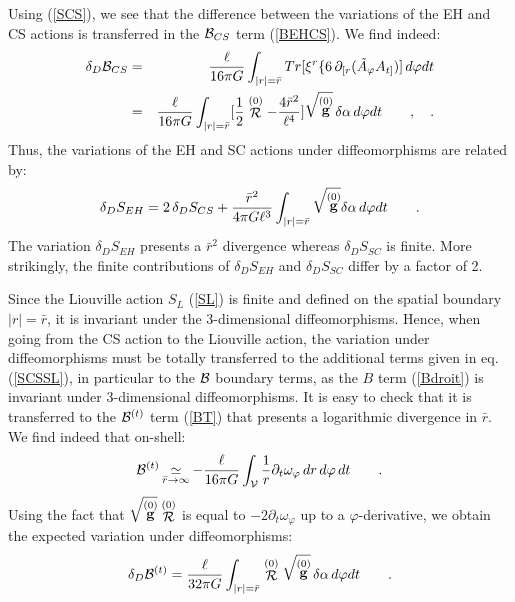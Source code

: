 \documentclass[a4paper,10pt]{article}
\begin{document}
Using (\ref{SCS}), we see that the difference between the variations 
of the EH and CS actions is transferred in
the ${\cal B}_{CS}$ term (\ref{BEHCS}). We find indeed:
\begin{eqnarray}
\delta_{D} {\cal B}_{CS} &=&
\frac  \ell {16 \pi G} 
\int_{|r|=\bar r} Tr [ \xi^r \{ 6 \,\partial_{[r} (\tilde A_\varphi A_{t]})]
 \, d\varphi dt \\
&=&
 \frac \ell {16 \pi G}
\int_{|r|=\bar r} [\frac 1 2 \stackrel {(0)} {\cal R}
- \frac {4 \bar  r^2}{\ell^4}]
 \sqrt{\stackrel {(0)} {\bf g}} \, \delta \alpha
 \, d\varphi dt
\qquad ,\quad .
\end{eqnarray}
Thus, the variations of the EH and SC actions under diffeomorphisms  
are related by:
\begin{equation}
\delta_{D} S_{EH} =  2 \, \delta_{D} S_{CS}
+ \frac {\bar  r^2} {4 \pi G \ell^3}  
\int_{|r|=\bar r} \sqrt{\stackrel {(0)} {\bf g}} \delta \alpha
 \, d\varphi dt \qquad .
\end{equation}
The variation $\delta_{D} S_{EH}$ presents a $\bar r^2$ divergence whereas 
$\delta_{D} S_{SC}$ is finite. More strikingly, the finite contributions
of $\delta_{D} S_{EH}$ and $\delta_{D} S_{SC}$
differ by a factor of 2. 

Since the Liouville action $S_L$ (\ref{SL}) is finite and defined on the
spatial boundary $|r|=\bar r$, it is invariant 
under the 3-dimensional diffeomorphisms. 
Hence, when going from the CS action to the Liouville action, 
the variation under diffeomorphisms must be totally transferred
to the additional terms given in eq. (\ref{SCSSL}), in particular
to the $\cal B$ boundary terms, 
as the $B$ term (\ref{Bdroit}) is invariant under 3-dimensional 
diffeomorphisms.
It is easy to check that it is transferred to 
the ${\cal B}^{(t)}$ term (\ref{BT}) that presents a logarithmic divergence 
in $\bar r$.
We find indeed that on-shell:
\begin{equation}
{\cal B}^{(t)} \mathop {\simeq} \limits_{\bar r \rightarrow \infty}
 - \frac \ell {16 \pi G} \int_{\cal V} \frac 1 r \partial_t \omega_\varphi 
\, dr \, d\varphi \, dt \qquad .
\end{equation}
Using the fact that $\sqrt{\stackrel {(0)} {\bf g}} \stackrel {(0)} {\cal R}$
is equal to $-2\partial_t \omega_\varphi$ up to a $\varphi$-derivative,
we obtain the expected variation under diffeomorphisms:
\begin{equation}
\delta_{D} {\cal B}^{(t)} = 
 \frac \ell {32 \pi G}
\int_{|r|=\bar r} \stackrel {(0)} {\cal R}
 \sqrt{\stackrel {(0)} {\bf g}} \, \delta \alpha
 \, d\varphi dt
\qquad .
\end{equation}
\end{document}
